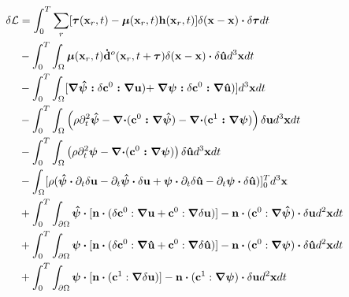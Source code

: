 \begin{equation}
	\begin{split}
		\delta\mathcal{L}
		& =\int^T_0\sum_{r}[\boldsymbol{{}\tau}(\mathbf{x}_r,t)-\boldsymbol{{}\mu}(\mathbf{x}_r,t)\mathbf{h}(\mathbf{x}_r,t)]\delta(\mathbf{x}-\mathbf{x})\boldsymbol{{}\cdot}\delta
		\boldsymbol{{}\tau}dt \\
		& -\int^T_0\int_{\Omega}
		\boldsymbol{{}\mu}(\mathbf{x}_r,t)\mathbf{\dot{d}}^o(\mathbf{x}_r,t+\boldsymbol{{}\tau})\delta(\mathbf{x}-\mathbf{x})\boldsymbol{{}\cdot}\delta
		\mathbf{\hat{u}}d^3\mathbf{x}dt\\
		& -\int^T_0\int_{\Omega}[
		\boldsymbol{{}\nabla\hat \psi:}\delta \boldsymbol{{}\mathbf{c}}^0\boldsymbol{{}:\nabla\mathbf{u}})
		+\boldsymbol{{}\nabla\psi:}\delta \boldsymbol{{}\mathbf{c}}^0\boldsymbol{{}: \nabla\mathbf{\hat{u}}})]
		d^3\mathbf{x}dt\\
		& -\int^T_0\int_{\Omega} \left(\rho\partial^2_t \boldsymbol{{}\hat \psi} -\boldsymbol{{}\nabla
		\cdot}	(\boldsymbol{{}\mathbf{c}}^0\boldsymbol{{}:\nabla\boldsymbol{{}\hat
		\psi}})-\boldsymbol{{}\nabla\cdot}(\boldsymbol{{}\mathbf{c}}^1\boldsymbol{{}:\nabla\psi})
		\right)\delta\mathbf{u}d^3\mathbf{x}dt\\
	&-\int^T_0\int_{\Omega} \left(\rho\partial^2_t
	\boldsymbol{{}\psi}-\boldsymbol{{}\nabla\cdot}(\boldsymbol{{}\mathbf{c}}^0\boldsymbol{{}:\nabla\boldsymbol{{}\psi}})\right)
	\delta\mathbf{\hat{u}}d^3\mathbf{x}dt\\
	&-\int_{\Omega} [\rho(\boldsymbol{{}\hat \psi}
	\boldsymbol{{}\cdot}\partial_t\delta\mathbf{u}-\partial_t\boldsymbol{{}\hat \psi}\boldsymbol{{}\cdot}\delta\mathbf{u}
	+\boldsymbol{{}\psi}\boldsymbol{{}\cdot}\partial_t\delta\mathbf{\hat{u}}-\partial_t
	\boldsymbol{{}\psi}\boldsymbol{{}\cdot}\delta\mathbf{\hat{u}})]^T_0d^3\mathbf{x}	\\
	&+\int^T_0\int_{\partial\Omega} \boldsymbol{{}\hat
	\psi}\boldsymbol{{}\cdot}[\mathbf{n}\boldsymbol{{}\cdot}(\delta\mathbf{c}^0:\boldsymbol{{}\nabla}\mathbf{u}+\mathbf{c}^0:\boldsymbol{{}\nabla}\delta\mathbf{u})]
	-\mathbf{n}\boldsymbol{{}\cdot}(\mathbf{c}^0:\boldsymbol{{}\nabla}\boldsymbol{{}\hat \psi})\boldsymbol{{}\cdot}\delta\mathbf{u}d^2\mathbf{x}dt\\
	&+\int^T_0\int_{\partial\Omega} \boldsymbol{{}
	\psi}\boldsymbol{{}\cdot}[\mathbf{n}\boldsymbol{{}\cdot}(\delta\mathbf{c}^0:\boldsymbol{{}\nabla}\mathbf{\hat{u}}+\mathbf{c}^0:\boldsymbol{{}\nabla}\delta\mathbf{\hat{u}})]
	-\mathbf{n}\boldsymbol{{}\cdot}(\mathbf{c}^0:\boldsymbol{{}\nabla}\boldsymbol{{}\psi})\boldsymbol{{}\cdot}\delta\mathbf{\hat{u}}d^2\mathbf{x}dt\\
	&+\int^T_0\int_{\partial\Omega} \boldsymbol{{}
	\psi}\boldsymbol{{}\cdot}[\mathbf{n}\boldsymbol{{}\cdot}(\mathbf{c}^1:\boldsymbol{{}\nabla}\delta\mathbf{u})]
	-\mathbf{n}\boldsymbol{{}\cdot}(\mathbf{c}^1:\boldsymbol{{}\nabla}\boldsymbol{{}\psi})\boldsymbol{{}\cdot}\delta\mathbf{u}d^2\mathbf{x}dt
	\end{split}
        \label{eq:DeltaLagrangian2}
\end{equation}
